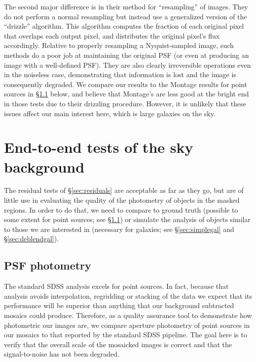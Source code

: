 \documentclass[10pt,preprint]{aastex}
\begin{document}
The second major difference is in their method for ``resampling'' of
images. They do not perform a normal resampling but instead use a
generalized version of the ``drizzle'' algorithm. This algorithm
computes the fraction of each original pixel that overlaps each output
pixel, and distributes the original pixel's flux accordingly. Relative
to properly resampling a Nyquist-sampled image, such methods do a poor
job at maintaining the original PSF (or even at producing an image
with a well-defined PSF). They are also clearly irreversible
operations even in the noiseless case, demonstrating that information
is lost and the image is consequently degraded. We compare our results
to the Montage results for point sources in \S\ref{sec:psfs} below,
and believe that Montage's are less good at the bright end in those
tests due to their drizzling procedure. However, it is unlikely that
these issues affect our main interest here, which is large galaxies on
the sky.

\section{End-to-end tests of the sky background}
\label{sec:endtoend}

The residual tests of \S\ref{sec:residuals} are acceptable as far as
they go, but are of little use in evaluating the quality of the
photometry of objects in the masked regions.  In order to do that, we
need to compare to ground truth (possible to some extent for point
sources; see \S\ref{sec:psfs}) or simulate the analysis of objects
similar to those we are interested in (necessary for galaxies; see
\S\ref{sec:simplegal} and \S\ref{sec:deblendgal}).

\subsection{PSF photometry}
\label{sec:psfs}

The standard SDSS analysis excels for point sources.  In fact, because
that analysis avoids interpolation, regridding or stacking of the data
we expect that its performance will be superior than anything that our
background subtracted mosaics could produce. Therefore, as a quality
assurance tool to demonstrate how photometric our images are, we
compare aperture photometry of point sources in our mosaics to that
reported by the standard SDSS pipeline. The goal here is to verify
that the overall scale of the mosaicked images is correct and that the
signal-to-noise has not been degraded.
\end{document}
